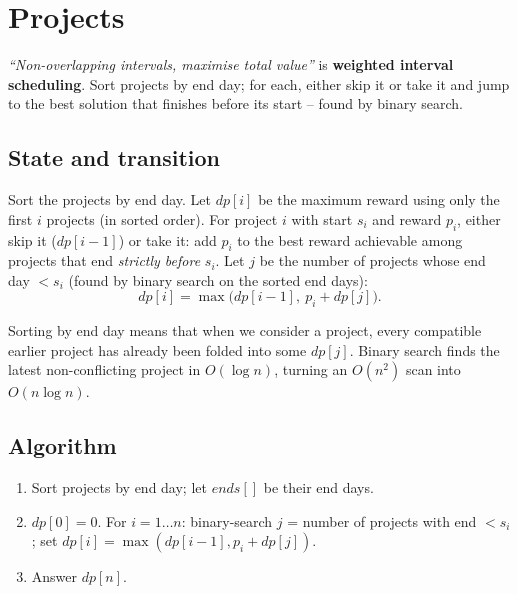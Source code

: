 \section{Projects}
\label{sec:cses-projects}


\begin{patternbox}
\emph{``Non-overlapping intervals, maximise total value''} is
\textbf{weighted interval scheduling}. Sort projects by end day; for each,
either skip it or take it and jump to the best solution that finishes
before its start -- found by binary search.
\end{patternbox}

\subsection*{State and transition}

Sort the projects by end day. Let $\textit{dp}[i]$ be the maximum reward
using only the first $i$ projects (in sorted order). For project $i$ with
start $s_i$ and reward $p_i$, either skip it ($\textit{dp}[i-1]$) or take
it: add $p_i$ to the best reward achievable among projects that end
\emph{strictly before} $s_i$. Let $j$ be the number of projects whose end
day $<s_i$ (found by binary search on the sorted end days):
\[
  \textit{dp}[i]=\max\big(\textit{dp}[i-1],\ p_i+\textit{dp}[j]\big).
\]

\begin{ideabox}
Sorting by end day means that when we consider a project, every compatible
earlier project has already been folded into some $\textit{dp}[j]$. Binary
search finds the latest non-conflicting project in $O(\log n)$, turning an
$O(n^2)$ scan into $O(n\log n)$.
\end{ideabox}

\subsection*{Algorithm}

\begin{enumerate}
  \item Sort projects by end day; let $\textit{ends}[]$ be their end
        days.
  \item $\textit{dp}[0]=0$. For $i=1\ldots n$: binary-search $j$ = number
        of projects with end $<s_i$; set
        $\textit{dp}[i]=\max(\textit{dp}[i-1], p_i+\textit{dp}[j])$.
  \item Answer $\textit{dp}[n]$.
\end{enumerate}

